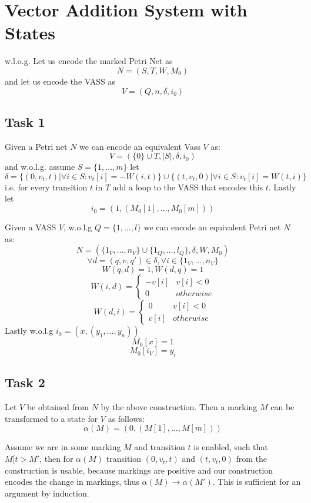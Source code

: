 \section{Vector Addition System with States}

w.l.o.g.
Let us encode the marked Petri Net as
\[N=(S,T,W,M_0)\]
and let us encode the VASS as
\[V=(Q,n,\delta,i_0)\]

\subsection{Task 1}
Given a Petri net $N$ we can encode an equivalent Vass $V$ as:
\[V=(\{0\} \cup T,|S|,\delta,i_0)\]
and w.o.l.g. assume $S=\{1,\dots,m\}$ let
\[\delta=\{(0,v_t,t)|\forall i \in S : v_t[i]=-W(i,t)\} \cup \{(t,v_t,0)|\forall i \in S : v_t[i]=W(t,i)\}\]
i.e. for every transition $t$ in $T$ add a loop to the VASS that encodes this $t$. Lastly let
\[i_0=(1,(M_0[1],\dots,M_0[m]))\]

Given a VASS $V$, w.o.l.g $Q=\{1,\dots,l\}$ we can encode an equivalent Petri net $N$ as:
\[ N=(\{1_V,\dots,n_V \} \cup \{1_Q,\dots,l_Q\},\delta,W,M_0)\]
\[\forall d=(q,v,q') \in \delta, \forall i \in \{1_V,\dots,n_V\}\] 
\[W(q,d)=1, W(d,q)=1\]
\[W(i,d)=
	\begin{cases} 
      -v[i] & v[i]<0\\
      0 & otherwise
	\end{cases}\]
\[W(d,i)=
	\begin{cases} 
      0 & v[i]<0\\
      v[i] & otherwise
	\end{cases}\]
Lastly w.o.l.g $i_0=(x,(y_1,\dots,y_n))$
\[M_0[x]=1\]
\[M_0[i_V]=y_i\]

\subsection{Task 2}

Let $V$ be obtained from $N$ by the above construction. Then a marking $M$ can be transformed to a state for $V$ as follows:
\[\alpha(M)=(0,(M[1],\dots,M[m]))\]

Assume we are in some marking $M$ and transition $t$ is enabled, such that $M[t>M'$, then for $\alpha(M)$ transition $(0,v_t,t)$ and $(t,v_t,0)$ from the construction is usable, because markings are positive and our construction encodes the change in markings, thus $\alpha(M)\rightarrow \alpha(M')$. This is sufficient for an argument by induction.

